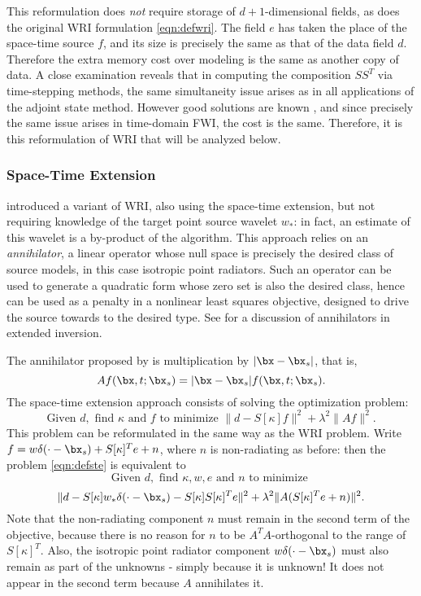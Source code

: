 This reformulation does {\em not} require storage of $d+1$-dimensional
fields, as does the original WRI formulation \ref{eqn:defwri}. The
field $e$ has taken the place of the space-time source $f$, and its
size is precisely the same as that of the data field $d$. Therefore
the extra memory cost over modeling is the same as another copy of
data. A close examination reveals that in computing the composition
$SS^T$ via time-stepping methods, the same simultaneity issue arises
as in all applications of the adjoint state method. However good
solutions are known \cite[]{Griewank:book}, and since precisely the
same issue arises in time-domain FWI, the cost is the same. Therefore,
it is this reformulation of WRI that will be analyzed below.

\subsubsection{Space-Time Extension}
\cite{HuangSymes:Geo18a} introduced a variant of WRI, also using the space-time extension, but not
requiring knowledge of the target point source wavelet $w_*$: in fact,
an estimate of this wavelet is a by-product of the algorithm. This
approach relies on an {\em annihilator}, a linear operator whose null
space is precisely the desired class of source models, in this case
isotropic point radiators. Such an operator can be used to generate a
quadratic form whose zero set is also the desired class, hence can be
used as a penalty in a nonlinear least squares objective, designed to
drive the source towards to the desired type. See \cite{geoprosp:2008}
for a discussion of annihilators in extended inversion.

The annihilator proposed by \cite{HuangSymes:Geo18a} is multiplication
by $|\bx-\bx_s|$, that is,
\begin{equation}
  \label{eqn:defann}
  Af(\bx,t;\bx_s) = |\bx-\bx_s|f(\bx,t;\bx_s).
\end{equation}
The space-time extension approach consists of solving the optimization
problem:
\begin{equation}
  \label{eqn:defste}
  \mbox{Given } d, \mbox{ find }\kappa \mbox{ and }f \mbox{ to
    minimize }
  \| d -  S[\kappa]f\|^2+\lambda^2\|Af\|^2.
\end{equation}
This problem can be reformulated in the same way as the WRI problem. Write
$f = w\delta(\cdot-\bx_s) + S[\kappa]^Te + n$, where $n$ is
non-radiating as before: then the problem \ref{eqn:defste} is
equivalent to
\[
   \mbox{Given } d, \mbox{ find }\kappa, w, e \mbox{ and }n \mbox{ to
     minimize }
 \]
\begin{equation}
  \label{eqn:defstereform}
  \| d -  S[\kappa]w_*\delta(\cdot-\bx_s) - S[\kappa]S[\kappa]^Te\|^2+\lambda^2\|A(S[\kappa]^Te+n)\|^2.
\end{equation}
Note that the non-radiating component $n$ must remain in the second
term of the objective, because there is no reason for $n$ to be
$A^TA$-orthogonal to the range of $S[\kappa]^T$. Also, the isotropic
point radiator component $w\delta(\cdot-\bx_s)$ must also remain as
part of the unknowns - simply because it is unknown! It does not
appear in the second term because $A$ annihilates it.

